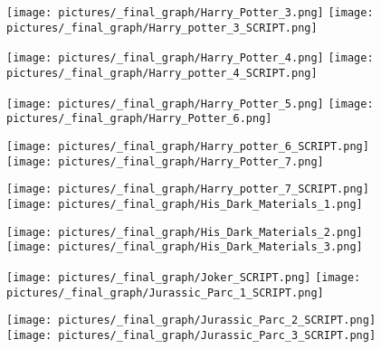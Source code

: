 \begin{figure} \ContinuedFloat
        \centering
        \texttt{[image: pictures/\_final\_graph/Harry\_Potter\_3.png]}
        \texttt{[image: pictures/\_final\_graph/Harry\_potter\_3\_SCRIPT.png]}
\end{figure}
\begin{figure} \ContinuedFloat
        \centering
        \texttt{[image: pictures/\_final\_graph/Harry\_Potter\_4.png]}
        \texttt{[image: pictures/\_final\_graph/Harry\_potter\_4\_SCRIPT.png]}
\end{figure}
\begin{figure} \ContinuedFloat
        \centering
        \texttt{[image: pictures/\_final\_graph/Harry\_Potter\_5.png]}
        \texttt{[image: pictures/\_final\_graph/Harry\_Potter\_6.png]}
\end{figure}
\begin{figure} \ContinuedFloat
        \centering
        \texttt{[image: pictures/\_final\_graph/Harry\_potter\_6\_SCRIPT.png]}
        \texttt{[image: pictures/\_final\_graph/Harry\_Potter\_7.png]}
\end{figure}
\begin{figure} \ContinuedFloat
        \centering
        \texttt{[image: pictures/\_final\_graph/Harry\_potter\_7\_SCRIPT.png]}
        \texttt{[image: pictures/\_final\_graph/His\_Dark\_Materials\_1.png]}
\end{figure}
\begin{figure} \ContinuedFloat
        \centering
        \texttt{[image: pictures/\_final\_graph/His\_Dark\_Materials\_2.png]}
        \texttt{[image: pictures/\_final\_graph/His\_Dark\_Materials\_3.png]}
\end{figure}
\begin{figure} \ContinuedFloat
        \centering
        \texttt{[image: pictures/\_final\_graph/Joker\_SCRIPT.png]}
        \texttt{[image: pictures/\_final\_graph/Jurassic\_Parc\_1\_SCRIPT.png]}
\end{figure}
\begin{figure} \ContinuedFloat
        \centering
        \texttt{[image: pictures/\_final\_graph/Jurassic\_Parc\_2\_SCRIPT.png]}
        \texttt{[image: pictures/\_final\_graph/Jurassic\_Parc\_3\_SCRIPT.png]}
\end{figure}
